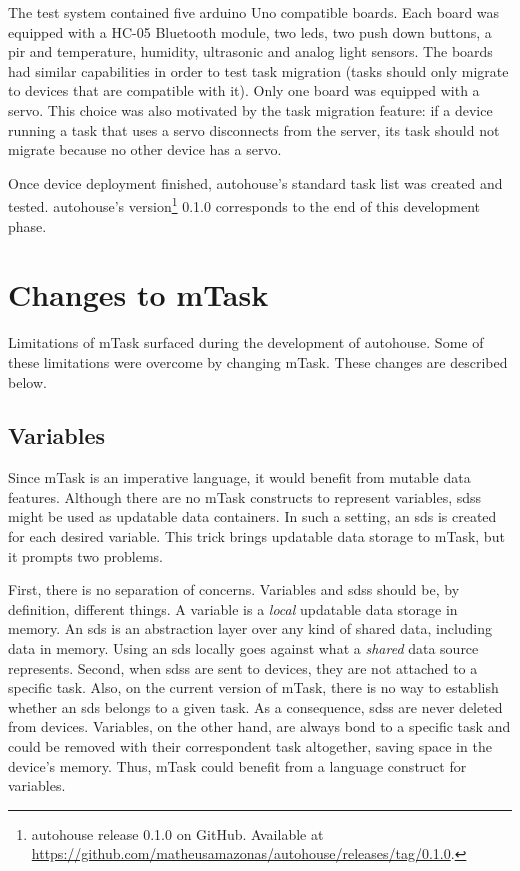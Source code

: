 The test system contained five \gls{arduino} Uno compatible boards. Each board was equipped with a HC-05 Bluetooth module, two \acsp{led}, two push down buttons, a \acs{pir} and temperature, humidity, ultrasonic and analog light sensors. The boards had similar capabilities in order to test task migration (tasks should only migrate to devices that are compatible with it). Only one board was equipped with a \gls{servo}. This choice was also motivated by the task migration feature: if a device running a task that uses a \gls{servo} disconnects from the server, its task should not migrate because no other device has a \gls{servo}.

Once device deployment finished, \gls{autohouse}'s standard task list was created and tested. \gls{autohouse}'s version\footnote{\gls{autohouse} release 0.1.0 on GitHub. Available at \url{https://github.com/matheusamazonas/autohouse/releases/tag/0.1.0}.} 0.1.0 corresponds to the end of this development phase.

\section{Changes to mTask}\label{sec:mtask_changes}

Limitations of \gls{mTask} surfaced during the development of \gls{autohouse}. Some of these limitations were overcome by changing \gls{mTask}. These changes are described below.

\subsection{Variables}

Since \gls{mTask} is an imperative language, it would benefit from mutable data features. Although there are no \gls{mTask} constructs to represent variables, \acp{sds} might be used as updatable data containers. In such a setting, an \ac{sds} is created for each desired variable. This trick brings updatable data storage to \gls{mTask}, but it prompts two problems. 

First, there is no separation of concerns. Variables and \acp{sds} should be, by definition, different things. A variable is a \textit{local} updatable data storage in memory. An \ac{sds} is an abstraction layer over any kind of shared data, including data in memory. Using an \ac{sds} locally goes against what a \textit{shared} data source represents. Second, when \acp{sds} are sent to devices, they are not attached to a specific task. Also, on the current version of \gls{mTask}, there is no way to establish whether an \ac{sds} belongs to a given task. As a consequence, \acp{sds} are never deleted from devices. Variables, on the other hand, are always bond to a specific task and could be removed with their correspondent task altogether, saving space in the device's memory. Thus, \gls{mTask} could benefit from a language construct for variables. 

